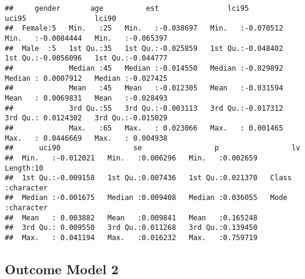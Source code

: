 \documentclass[
]{article}
\begin{document}
\begin{verbatim}
##     gender       age          est                lci95               uci95                lci90          
##  Female:5   Min.   :25   Min.   :-0.038697   Min.   :-0.070512   Min.   :-0.0084444   Min.   :-0.065397  
##  Male  :5   1st Qu.:35   1st Qu.:-0.025859   1st Qu.:-0.048402   1st Qu.:-0.0056096   1st Qu.:-0.044777  
##             Median :45   Median :-0.014550   Median :-0.029892   Median : 0.0007912   Median :-0.027425  
##             Mean   :45   Mean   :-0.012305   Mean   :-0.031594   Mean   : 0.0069831   Mean   :-0.028493  
##             3rd Qu.:55   3rd Qu.:-0.003113   3rd Qu.:-0.017312   3rd Qu.: 0.0124302   3rd Qu.:-0.015029  
##             Max.   :65   Max.   : 0.023066   Max.   : 0.001465   Max.   : 0.0446669   Max.   : 0.004938  
##      uci90                 se                 p                 lv           
##  Min.   :-0.012021   Min.   :0.006296   Min.   :0.002659   Length:10         
##  1st Qu.:-0.009158   1st Qu.:0.007436   1st Qu.:0.021370   Class :character  
##  Median :-0.001675   Median :0.009408   Median :0.036055   Mode  :character  
##  Mean   : 0.003882   Mean   :0.009841   Mean   :0.165248                     
##  3rd Qu.: 0.009550   3rd Qu.:0.011268   3rd Qu.:0.139450                     
##  Max.   : 0.041194   Max.   :0.016232   Max.   :0.759719
\end{verbatim}

\hypertarget{outcome-model-2}{%
\subsection{Outcome Model 2}\label{outcome-model-2}}
\end{document}
